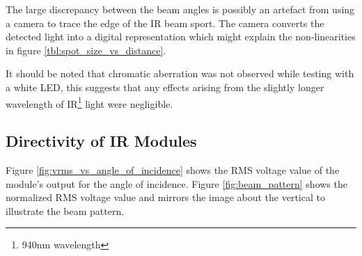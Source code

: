 The large discrepancy between the beam angles is possibly an artefact from using a camera to trace the edge of the IR beam sport. The camera converts the detected light into a digital representation which might explain the non-linearities in figure \ref{tbl:spot_size_vs_distance}.

It should be noted that chromatic aberration was not observed while testing with a white LED, this suggests that any effects arising from the slightly longer wavelength of IR\footnote{940nm wavelength} light were negligible.






\subsection{Directivity of IR Modules}

Figure \ref{fig:vrms_vs_angle_of_incidence} shows the RMS voltage value of the module's output for the angle of incidence. Figure \ref{fig:beam_pattern} shows the normalized RMS voltage value and mirrors the image about the vertical to illustrate the beam pattern.


